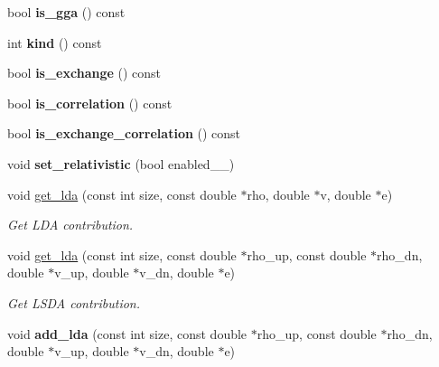 \begin{DoxyCompactItemize}
\item 
\hypertarget{classsirius_1_1_x_c__functional_af6bd0c12e65fbe9641eec40b4c7494e5}{}bool {\bfseries is\+\_\+gga} () const \label{classsirius_1_1_x_c__functional_af6bd0c12e65fbe9641eec40b4c7494e5}

\item 
\hypertarget{classsirius_1_1_x_c__functional_aca3bf7b2497c7e0612223f4f7d6c0082}{}int {\bfseries kind} () const \label{classsirius_1_1_x_c__functional_aca3bf7b2497c7e0612223f4f7d6c0082}

\item 
\hypertarget{classsirius_1_1_x_c__functional_a2cdd88346f105de16288323767189782}{}bool {\bfseries is\+\_\+exchange} () const \label{classsirius_1_1_x_c__functional_a2cdd88346f105de16288323767189782}

\item 
\hypertarget{classsirius_1_1_x_c__functional_aad70a85b653ed9f89d3173a707112688}{}bool {\bfseries is\+\_\+correlation} () const \label{classsirius_1_1_x_c__functional_aad70a85b653ed9f89d3173a707112688}

\item 
\hypertarget{classsirius_1_1_x_c__functional_a734b7d0c0ae5d4717cfee0eefbbbc8c2}{}bool {\bfseries is\+\_\+exchange\+\_\+correlation} () const \label{classsirius_1_1_x_c__functional_a734b7d0c0ae5d4717cfee0eefbbbc8c2}

\item 
\hypertarget{classsirius_1_1_x_c__functional_ab984282343d1313b7b5e77aa8a9cd2bf}{}void {\bfseries set\+\_\+relativistic} (bool enabled\+\_\+\+\_\+)\label{classsirius_1_1_x_c__functional_ab984282343d1313b7b5e77aa8a9cd2bf}

\item 
void \hyperlink{classsirius_1_1_x_c__functional_a7325a187310b50380c96c3a411116c0e}{get\+\_\+lda} (const int size, const double $\ast$rho, double $\ast$v, double $\ast$e)
\begin{DoxyCompactList}\small\item\em Get L\+D\+A contribution. \end{DoxyCompactList}\item 
void \hyperlink{classsirius_1_1_x_c__functional_ac8d443686f62962be10c1595a9580ffe}{get\+\_\+lda} (const int size, const double $\ast$rho\+\_\+up, const double $\ast$rho\+\_\+dn, double $\ast$v\+\_\+up, double $\ast$v\+\_\+dn, double $\ast$e)
\begin{DoxyCompactList}\small\item\em Get L\+S\+D\+A contribution. \end{DoxyCompactList}\item 
\hypertarget{classsirius_1_1_x_c__functional_a7288b07ad9546312c09a38e9666f40fb}{}void {\bfseries add\+\_\+lda} (const int size, const double $\ast$rho\+\_\+up, const double $\ast$rho\+\_\+dn, double $\ast$v\+\_\+up, double $\ast$v\+\_\+dn, double $\ast$e)\label{classsirius_1_1_x_c__functional_a7288b07ad9546312c09a38e9666f40fb}


\end{DoxyCompactItemize}
